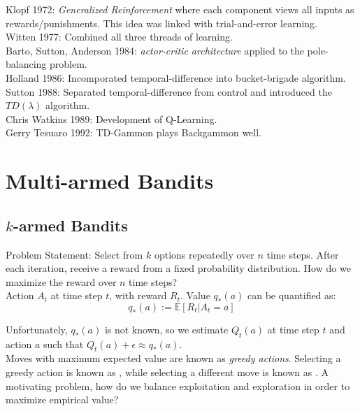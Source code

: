 \documentclass[a4paper]{article}
\begin{document}
Klopf 1972: \textit{Generalized Reinforcement} where each component views all inputs as rewards/punishments. This idea was linked with trial-and-error learning.\\

Witten 1977: Combined all three threads of learning.\\

Barto, Sutton, Anderson 1984: \textit{actor-critic architecture} applied to the pole-balancing problem.\\

Holland 1986: Incomporated temporal-difference into bucket-brigade algorithm.\\

Sutton 1988: Separated temporal-difference from control and introduced the $TD(\lambda)$ algorithm.\\

Chris Watkins 1989: Development of Q-Learning.\\

Gerry Tesuaro 1992: TD-Gammon plays Backgammon well.\\

\section{Multi-armed Bandits}
\subsection{$k$-armed Bandits}

Problem Statement: Select from $k$ options repeatedly over $n$ time steps. After each iteration, receive a reward from a fixed probability distribution. How do we maximize the reward over $n$ time steps?\\

Action $A_t$ at time step $t$, with reward $R_t$. Value $q_*(a)$ can be quantified as: $$q_*(a) := \mathbb{E}[R_t | A_t = a]$$

Unfortunately, $q_*(a)$ is not known, so we estimate $Q_t(a)$ at time step $t$ and action $a$ such that $Q_t(a) + \epsilon \approx q_*(a)$.\\

Moves with maximum expected value are known as \textit{greedy actions}. Selecting a greedy action is known as , while selecting a different move is known as . A motivating problem, how do we balance exploitation and exploration in order to maximize empirical value?
\end{document}
